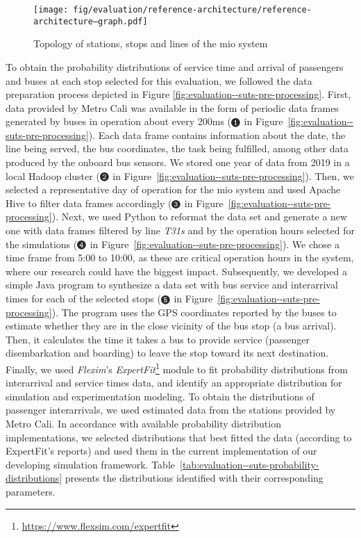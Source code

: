 \begin{figure}[h]
	\centering
	\texttt{[image: fig/evaluation/reference-architecture/reference-architecture--graph.pdf]}
	\caption{Topology of stations, stops and lines of the \gls{mio} system}
	\label{fig:evaluation--suts-graph}
\end{figure}

To obtain the probability distributions of service time and arrival of passengers and buses at each stop selected for this evaluation, we followed the data preparation process depicted in Figure \ref{fig:evaluation--suts-pre-processing}. First, data provided by Metro Cali was available in the form of periodic data frames generated by buses in operation about every 200ms (\cf $\encircleblack{1}$ in Figure~\ref{fig:evaluation--suts-pre-processing}). Each data frame contains information about the date, the line being served, the bus coordinates, the task being fulfilled, among other data produced by the onboard bus sensors. We stored one year of data from 2019 in a local Hadoop cluster (\cf $\encircleblack{2}$ in Figure~\ref{fig:evaluation--suts-pre-processing}). Then, we selected a representative day of operation for the \gls{mio} system and used Apache Hive to filter data frames accordingly (\cf $\encircleblack{3}$ in Figure~\ref{fig:evaluation--suts-pre-processing}). Next, we used Python to reformat the data set and generate a new one with data frames filtered by line \textit{T31s} and by the operation hours selected for the simulations (\cf $\encircleblack{4}$ in Figure~\ref{fig:evaluation--suts-pre-processing}). We chose a time frame from 5:00 to 10:00, as these are critical operation hours in the system, where our research could have the biggest impact. Subsequently, we developed a simple Java program to synthesize a data set with bus service and interarrival times for each of the selected stops (\cf $\encircleblack{5}$ in Figure~\ref{fig:evaluation--suts-pre-processing}). The program uses the GPS coordinates reported by the buses to estimate whether they are in the close vicinity of the bus stop (\ie a bus arrival). Then, it calculates the time it takes a bus to provide service (\eg passenger disembarkation and boarding) to leave the stop toward its next destination.  Finally, we used \textit{Flexim}'s \textit{ExpertFit}\footnote{\url{https://www.flexsim.com/expertfit}} module to fit probability distributions from interarrival and service times data, and identify an appropriate distribution for simulation and experimentation modeling. To obtain the distributions of passenger interarrivals, we used estimated data from the stations provided by Metro Cali. In accordance with available probability distribution implementations, we selected distributions that best fitted the data (according to ExpertFit's reports) and used them in the current implementation of our developing simulation framework.  Table~\ref{tab:evaluation--suts-probability-distributions} presents the distributions identified with their corresponding parameters. 

